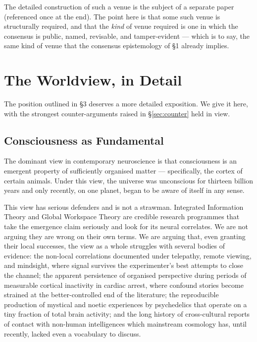 \documentclass[11pt,a4paper]{article}
\begin{document}
The detailed construction of such a venue is the subject of a
separate paper (referenced once at the end). The point here is
that some such venue is structurally required, and that the
\emph{kind} of venue required is one in which the consensus is
public, named, revisable, and tamper-evident --- which is to say,
the same kind of venue that the consensus epistemology of \S1
already implies.

\section{The Worldview, in Detail}

The position outlined in \S3 deserves a more detailed exposition.
We give it here, with the strongest counter-arguments raised in
\S\ref{sec:counter} held in view.

\subsection{Consciousness as Fundamental}

The dominant view in contemporary neuroscience is that consciousness
is an emergent property of sufficiently organised matter ---
specifically, the cortex of certain animals. Under this view, the
universe was unconscious for thirteen billion years and only
recently, on one planet, began to be aware of itself in any sense.

This view has serious defenders and is not a strawman. Integrated
Information Theory and Global Workspace Theory are credible
research programmes that take the emergence claim seriously and
look for its neural correlates. We are not arguing they are wrong
on their own terms. We are arguing that, even granting their local
successes, the view as a whole struggles with several bodies of
evidence: the non-local correlations documented under telepathy,
remote viewing, and mindsight, where signal survives the
experimenter's best attempts to close the channel; the apparent
persistence of organised perspective during periods of measurable
cortical inactivity in cardiac arrest, where confound stories
become strained at the better-controlled end of the literature;
the reproducible production of mystical and noetic experiences by
psychedelics that operate on a tiny fraction of total brain
activity; and the long history of cross-cultural reports of
contact with non-human intelligences which mainstream cosmology
has, until recently, lacked even a vocabulary to discuss.
\end{document}
